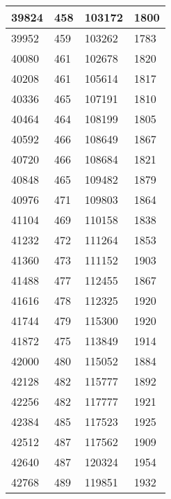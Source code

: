 \begin{longtable}{|l|l|l|l|}
		39824 & 458         & 103172          & 1800             \\ \hline
		39952 & 459         & 103262          & 1783             \\ \hline
		40080 & 461         & 102678          & 1820             \\ \hline
		40208 & 461         & 105614          & 1817             \\ \hline
		40336 & 465         & 107191          & 1810             \\ \hline
		40464 & 464         & 108199          & 1805             \\ \hline
		40592 & 466         & 108649          & 1867             \\ \hline
		40720 & 466         & 108684          & 1821             \\ \hline
		40848 & 465         & 109482          & 1879             \\ \hline
		40976 & 471         & 109803          & 1864             \\ \hline
		41104 & 469         & 110158          & 1838             \\ \hline
		41232 & 472         & 111264          & 1853             \\ \hline
		41360 & 473         & 111152          & 1903             \\ \hline
		41488 & 477         & 112455          & 1867             \\ \hline
		41616 & 478         & 112325          & 1920             \\ \hline
		41744 & 479         & 115300          & 1920             \\ \hline
		41872 & 475         & 113849          & 1914             \\ \hline
		42000 & 480         & 115052          & 1884             \\ \hline
		42128 & 482         & 115777          & 1892             \\ \hline
		42256 & 482         & 117777          & 1921             \\ \hline
		42384 & 485         & 117523          & 1925             \\ \hline
		42512 & 487         & 117562          & 1909             \\ \hline
		42640 & 487         & 120324          & 1954             \\ \hline
		42768 & 489         & 119851          & 1932             \\ \hline

\end{longtable}
